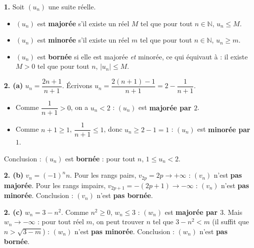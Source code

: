 \documentclass[11pt]{article}
\begin{document}
\begin{corrige}
\textbf{1.} Soit $(u_n)$ une suite réelle.
\begin{itemize}
\item $(u_n)$ est \textbf{majorée} s'il existe un réel $M$ tel que pour tout $n \in \mathbb{N}$, $u_n \leq M$.
\item $(u_n)$ est \textbf{minorée} s'il existe un réel $m$ tel que pour tout $n \in \mathbb{N}$, $u_n \geq m$.
\item $(u_n)$ est \textbf{bornée} si elle est majorée \emph{et} minorée, ce qui équivaut à : il existe $M > 0$ tel que pour tout $n$, $|u_n| \leq M$.
\end{itemize}

\textbf{2. (a)} $u_n = \dfrac{2n+1}{n+1}$. Écrivons $u_n = \dfrac{2(n+1) - 1}{n+1} = 2 - \dfrac{1}{n+1}$.
\begin{itemize}
\item Comme $\dfrac{1}{n+1} > 0$, on a $u_n < 2$ : $(u_n)$ est \textbf{majorée par $2$}.
\item Comme $n + 1 \geq 1$, $\dfrac{1}{n+1} \leq 1$, donc $u_n \geq 2 - 1 = 1$ : $(u_n)$ est \textbf{minorée par $1$}.
\end{itemize}
Conclusion : $(u_n)$ est \textbf{bornée} : pour tout $n$, $1 \leq u_n < 2$.

\textbf{2. (b)} $v_n = (-1)^n n$. Pour les rangs pairs, $v_{2p} = 2p \to +\infty$ : $(v_n)$ n'est \textbf{pas majorée}. Pour les rangs impairs, $v_{2p+1} = -(2p+1) \to -\infty$ : $(v_n)$ n'est \textbf{pas minorée}. Conclusion : $(v_n)$ n'est \textbf{pas bornée}.

\textbf{2. (c)} $w_n = 3 - n^2$. Comme $n^2 \geq 0$, $w_n \leq 3$ : $(w_n)$ est \textbf{majorée par $3$}. Mais $w_n \to -\infty$ : pour tout réel $m$, on peut trouver $n$ tel que $3 - n^2 < m$ (il suffit que $n > \sqrt{3 - m}$) : $(w_n)$ n'est \textbf{pas minorée}. Conclusion : $(w_n)$ n'est \textbf{pas bornée}.
\end{corrige}
\end{document}
